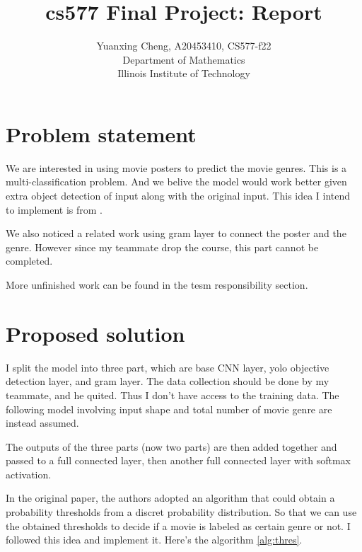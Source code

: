 \documentclass{article}
\title{cs577 Final Project: Report}
\author{Yuanxing Cheng, A20453410, CS577-f22\\ Department of Mathematics \\Illinois Institute of Technology}
\begin{document}
\maketitle
\section{Problem statement}

We are interested in using movie posters to predict the movie genres. This is a multi-classification problem. And we belive the model would work better given extra object detection of input along with the original input. This idea I intend to implement is from \cite{chu2017movie}.

We also noticed a related work using gram layer \cite{wi_poster-based_2020} to connect the poster and the genre. However since my teammate drop the course, this part cannot be completed.

More unfinished work can be found in the tesm responsibility section.

\section{Proposed solution}

I split the model into three part, which are base CNN layer, yolo objective detection layer, and gram layer. The data collection should be done by my teammate, and he quited. Thus I don't have access to the training data. The following model involving input shape and total number of movie genre are instead assumed.

The outputs of the three parts (now two parts) are then added together and passed to a full connected layer, then another full connected layer with softmax activation.

In the original paper, the authors adopted an algorithm that could obtain a probability thresholds from a discret probability distribution. So that we can use the obtained thresholds to decide if a movie is labeled as certain genre or not. I followed this idea and implement it. Here's the algorithm \ref{alg:thres}.
\end{document}
